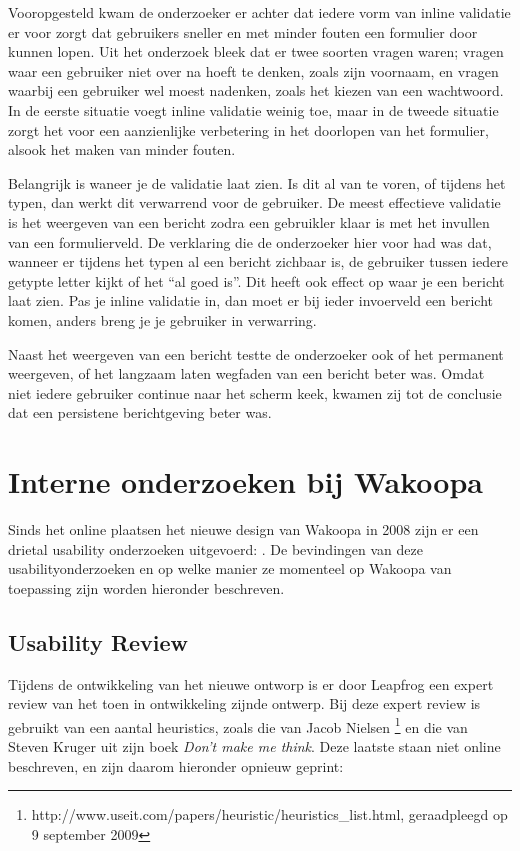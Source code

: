 \documentclass[a4paper, 10pt, pdftex]{report}
\begin{document}
    Vooropgesteld kwam de onderzoeker er achter  dat iedere vorm van inline validatie er voor zorgt dat gebruikers sneller en met minder fouten een formulier door kunnen lopen. Uit het onderzoek bleek dat er twee soorten vragen waren; vragen waar een gebruiker niet over na hoeft te denken, zoals zijn voornaam, en vragen waarbij een gebruiker wel moest nadenken, zoals het kiezen van een wachtwoord. In de eerste situatie voegt inline validatie weinig toe, maar in de tweede situatie zorgt het voor een aanzienlijke verbetering in het doorlopen van het formulier, alsook het maken van minder fouten.

    Belangrijk is waneer je de validatie laat zien. Is dit al van te voren, of tijdens het typen, dan werkt dit verwarrend voor de gebruiker. De meest effectieve validatie is het weergeven van een bericht zodra een gebruikler klaar is met het invullen van een formulierveld. De verklaring die de onderzoeker hier voor had was dat, wanneer er tijdens het typen al een bericht zichbaar is, de gebruiker tussen iedere getypte letter kijkt of het ``al goed is''. Dit heeft ook effect op waar je een bericht laat zien. Pas je inline validatie in, dan moet er bij ieder invoerveld een bericht komen, anders breng je je gebruiker in verwarring.

    Naast het weergeven van een bericht testte de onderzoeker ook of het permanent weergeven, of het langzaam laten wegfaden van een bericht beter was. Omdat niet iedere gebruiker continue naar het scherm keek, kwamen zij tot de conclusie dat een persistene berichtgeving beter was.

  \section{Interne onderzoeken bij Wakoopa}
    Sinds het online plaatsen het nieuwe design van Wakoopa in 2008 zijn er een drietal usability onderzoeken uitgevoerd: \citet{Timmerman2008, Hoekman2008, Alfrink2008}. De bevindingen van deze usabilityonderzoeken en op welke manier ze momenteel op Wakoopa van toepassing zijn worden hieronder beschreven.

    \subsection{Usability Review \citet{Alfrink2008}}
    Tijdens de ontwikkeling van het nieuwe ontworp is er door Leapfrog een expert review van het toen in ontwikkeling zijnde ontwerp. Bij deze expert review is gebruikt van een aantal heuristics, zoals die van Jacob Nielsen \footnote{http://www.useit.com/papers/heuristic/heuristics\_list.html, geraadpleegd op 9 september 2009} en die van Steven Kruger uit zijn boek \emph{Don't make me think}. Deze laatste staan niet online beschreven, en zijn daarom hieronder opnieuw geprint:
\end{document}
